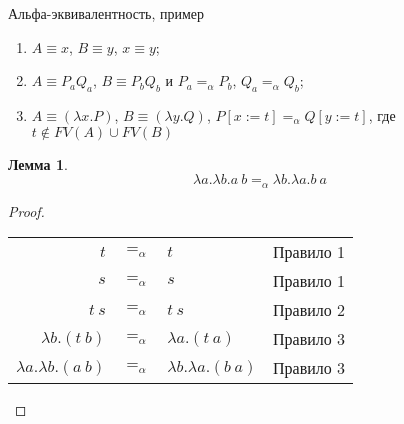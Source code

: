 \documentclass[aspectratio=169]{beamer}
\newtheorem{lmm}{Лемма}[section]
\begin{document}
\begin{frame}{Альфа-эквивалентность, пример}
\begin{enumerate}
\item \color{gray}$A \equiv x$, $B \equiv y$, $x \equiv y$;
\item \color{gray}$A \equiv P_a Q_a$, $B \equiv P_b Q_b$ и $P_a =_\alpha P_b$, $Q_a =_\alpha Q_b$;
\item \color{gray}$A \equiv (\lambda x.P)$, $B \equiv (\lambda y.Q)$, $P[x := t] =_\alpha Q[y := t]$, где $t \notin FV(A)\cup FV(B)$
\end{enumerate}\vspace{-0.2cm}\begin{lmm}\vspace{-0.3cm}
$$\lambda a.\lambda b.a\ b =_\alpha \lambda b.\lambda a.b\ a$$\vspace{-0.3cm}
\end{lmm}\vspace{-0.3cm}
\begin{proof}
\begin{center}\begin{tabular}{rcll}
  $t$ & $=_\alpha$ &$t$& Правило 1\\
  $s$ & $=_\alpha$ &$s$& Правило 1\\
  $t\ s$ & $=_\alpha$ &$t\ s$& Правило 2\\
  $\lambda b.(t\ b)$ & $=_\alpha$ &$\lambda a.(t\ a)$ & Правило 3\\
  $\lambda a.\lambda b.(a\ b)$ & $=_\alpha$ &$\lambda b.\lambda a.(b\ a)$ & Правило 3\\
\end{tabular}\end{center}\vspace{-0.3cm}
\end{proof}
\end{frame}
\end{document}

